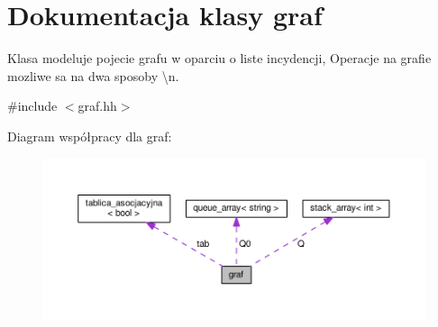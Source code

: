 \hypertarget{classgraf}{\section{Dokumentacja klasy graf}
\label{classgraf}
}


Klasa modeluje pojecie grafu w oparciu o liste incydencji, Operacje na grafie mozliwe sa na dwa sposoby \textbackslash{}n.  




{\ttfamily \#include $<$graf.\-hh$>$}



Diagram współpracy dla graf\-:\nopagebreak
\begin{figure}[H]
\begin{center}
\leavevmode
\includegraphics[width=350pt]{classgraf__coll__graph}
\end{center}
\end{figure}
